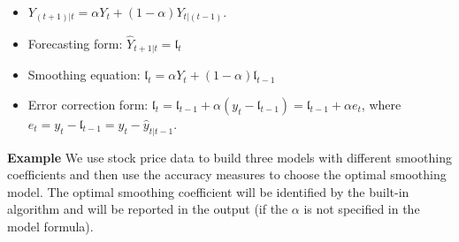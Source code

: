 \documentclass[
]{book}
\begin{document}
\begin{itemize}
\item
  \(Y_{(t+1)|t} = \alpha Y_t + (1-\alpha)Y_{t|(t-1)}\).
\item
  Forecasting form: \(\hat{Y}_{t+1|t} = \mathfrak{l}_t\)
\item
  Smoothing equation: \(\mathfrak{l}_t = \alpha Y_t + (1-\alpha)\mathfrak{l}_{t-1}\)
\item
  Error correction form: \(\mathfrak{l}_t=\mathfrak{l}_{t-1} + \alpha (y_t-\mathfrak{l}_{t-1}) = \mathfrak{l}_{t-1} + \alpha e_{t}\), where \(e_t=y_t - \mathfrak{l}_{t-1} = y_t-\hat{y}_{t|t-1}\).
\end{itemize}

\textbf{Example} We use stock price data to build three models with different smoothing coefficients and then use the accuracy measures to choose the optimal smoothing model. The optimal smoothing coefficient will be identified by the built-in algorithm and will be reported in the output (if the \(\alpha\) is not specified in the model formula).
\end{document}
